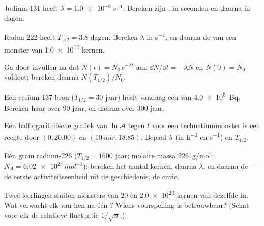 \begin{exercise}[$\star$]\label{exo:g12:radioactive-decay:1}
Jodium-131 heeft $\lambda = \qty{1.0e-6}{s^{-1}}$. Bereken zijn
, in seconden en daarna in dagen.
\end{exercise}

\begin{exercise}[$\star$]\label{exo:g12:radioactive-decay:2}
Radon-222 heeft $T_{1/2} = 3.8$ dagen. Bereken $\lambda$ in \unit{s^{-1}}, en
daarna de  van een monster van \num{1.0e10} kernen.
\end{exercise}

\begin{exercise}[$\star$]\label{exo:g12:radioactive-decay:3}
Ga door invullen na dat $N(t) = N_0\,e^{-\lambda t}$ aan
$\dd N/\dd t = -\lambda N$ en $N(0) = N_0$ voldoet; bereken daarna
$N(T_{1/2})/N_0$.
\end{exercise}

\begin{exercise}[$\star$]\label{exo:g12:radioactive-decay:4}
Een cesium-137-bron ($T_{1/2} = 30$ jaar) heeft vandaag een  van
\qty{4.0e5}{Bq}. Bereken haar  over $90$ jaar, en daarna over $300$
jaar.
\end{exercise}

\begin{exercise}[$\star$]\label{exo:g12:radioactive-decay:5}
Een halflogaritmische grafiek van $\ln \mathcal A$ tegen $t$ voor een
technetiummonster is een rechte door $(0, 20.00)$ en
$(\qty{10}{uur}, 18.85)$. Bepaal $\lambda$ (in \unit{h^{-1}} en
\unit{s^{-1}}) en $T_{1/2}$.
\end{exercise}

\begin{exercise}[$\star\star$]\label{exo:g12:radioactive-decay:6}
Eén gram radium-226 ($T_{1/2} = 1600$ jaar; molaire massa \qty{226}{g/mol};
$N_A = \qty{6.02e23}{mol^{-1}}$): bereken het aantal kernen, daarna $\lambda$,
en daarna de  --- de eerste activiteitseenheid uit de geschiedenis,
de curie.
\end{exercise}

\begin{exercise}[$\star\star$]\label{exo:g12:radioactive-decay:7}
Twee leerlingen sluiten monsters van $20$ en \num{2.0e20} kernen van dezelfde
 in. Wat verwacht elk van hen na één ? Wiens voorspelling
is betrouwbaar? (Schat voor elk de relatieve fluctuatie $1/\sqrt n$.)
\end{exercise}

